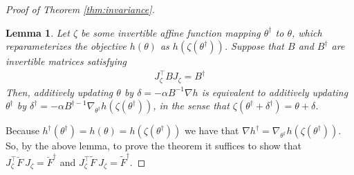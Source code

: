 \documentclass[12pt]{article}
\newcommand{\B}{B}
\newtheorem{lemma}[theorem]{Lemma}
\begin{document}
\begin{proof}[Proof of Theorem \ref{thm:invariance}]
\begin{lemma}
\label{lemma:invar}
Let $\zeta$ be some invertible affine function mapping $\theta^\dagger$ to $\theta$, which reparameterizes the objective $h(\theta)$ as $h(\zeta(\theta^\dagger))$.  Suppose that $\B$ and $\B^\dagger$ are invertible matrices satisfying
\begin{align*}
J_\zeta^\top \B J_\zeta = \B^\dagger
\end{align*}
Then, additively updating $\theta$ by $\delta = -\alpha \B^{-1} \nabla h$ is equivalent to additively updating $\theta^\dagger$ by $\delta^\dagger = -\alpha \B^{\dagger-1} \nabla_{\theta^\dagger} h(\zeta(\theta^\dagger))$, in the sense that $\zeta(\theta^\dagger + \delta^\dagger ) = \theta + \delta$.
\end{lemma}



Because $h^\dagger(\theta^\dagger) = h(\theta) = h(\zeta(\theta^\dagger))$ we have that $\nabla h^\dagger = \nabla_{\theta^\dagger} h(\zeta(\theta^\dagger))$.   So, by the above lemma, to prove the theorem it suffices to show that $J_\zeta^\top \breve{F} \ J_\zeta = \breve{F}^\dagger$ and $J_\zeta^\top \tilde{F} \ J_\zeta = \tilde{F}^\dagger$.%


\end{proof}
\end{document}
